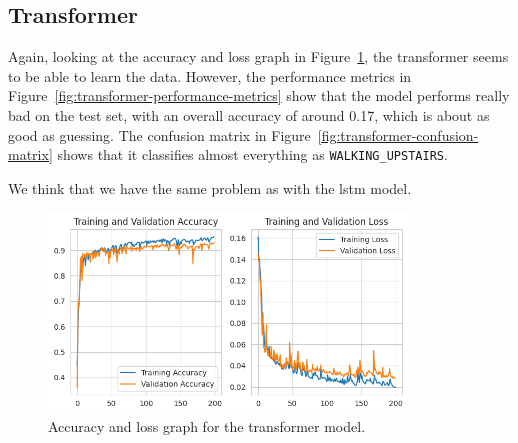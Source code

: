 \subsection{Transformer}\label{subsec:transformer}

Again, looking at the accuracy and loss graph in Figure~\ref{fig:transformer-accuracy-loss-graph}, the transformer seems to be able to learn the data.
However, the performance metrics in Figure~\ref{fig:transformer-performance-metrics} show that the model performs really bad on the test set, with an overall accuracy of around 0.17, which is about as good as guessing.
The confusion matrix in Figure~\ref{fig:transformer-confusion-matrix} shows that it classifies almost everything as \texttt{WALKING\_UPSTAIRS}.

We think that we have the same problem as with the lstm model.

\begin{figure}[ht]
    \centering
    \includegraphics[width=0.85\textwidth]{./img/transformer/accuracy-loss-graph}
    \caption{Accuracy and loss graph for the transformer model.}
    \label{fig:transformer-accuracy-loss-graph}
\end{figure}

